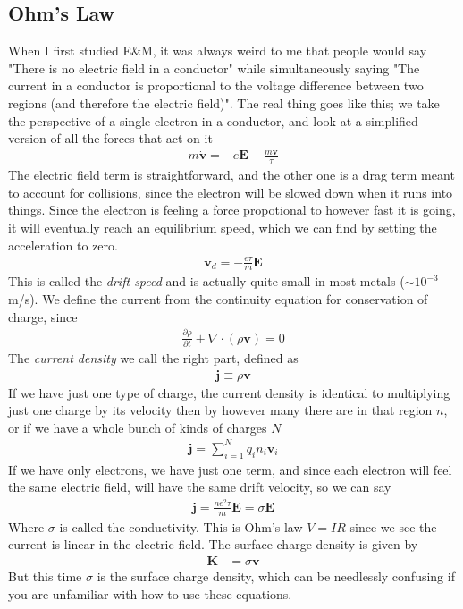 \subsection{Ohm's Law}
When I first studied E\&M, it was always weird to me that people would say "There is no electric field in a conductor" while simultaneously saying "The current in a conductor is proportional to the voltage difference between two regions (and therefore the electric field)". The real thing goes like this; we take the perspective of a single electron in a conductor, and look at a simplified version of all the forces that act on it
\begin{align}
m\dot{\textbf{v}} = -e\textbf{E} -  \frac{m\textbf{v}}{\tau}
\end{align}
The electric field term is straightforward, and the other one is a drag term meant to account for collisions, since the electron will be slowed down when it runs into things. Since the electron is feeling a force propotional to however fast it is going, it will eventually reach an equilibrium speed, which we can find by setting the acceleration to zero.
\begin{align}
\textbf{v}_d = -\frac{e\tau}{m}\textbf{E}
\end{align}
This is called the \emph{drift speed} and is actually quite small in most metals ($\sim 10^{-3}$ m/s). We define the current from the continuity equation for conservation of charge, since
\begin{align}
\frac{\partial \rho}{\partial t} +\nabla\cdot(\rho\textbf{v}) = 0
\end{align}
The \emph{current density} we call the right part, defined as
\begin{align}
\textbf{j} \equiv \rho\textbf{v}
\end{align}
If we have just one type of charge, the current density is identical to multiplying just one charge by its velocity then by however many there are in that region $n$, or if we have a whole bunch of kinds of charges $N$
\begin{align}
\textbf{j} = \sum_{i=1}^N q_in_i\textbf{v}_i
\end{align}
If we have only electrons, we have just one term, and since each electron will feel the same electric field, will have the same drift velocity, so we can say
\begin{align}
\textbf{j} = \frac{ne^2\tau}{m}\textbf{E} = \sigma\textbf{E}
\end{align}
Where $\sigma$ is called the conductivity. This is Ohm's law $V=IR$ since we see the current is linear in the electric field.
The surface charge density is given by
\begin{align}
\textbf{K} &= \sigma \textbf{v}
\end{align}
But this time $\sigma$ is the surface charge density, which can be needlessly confusing if you are unfamiliar with how to use these equations.
